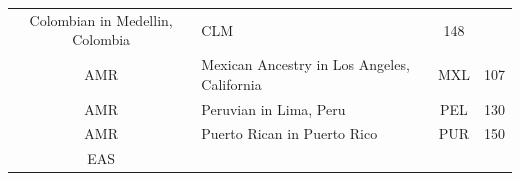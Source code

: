 \documentclass[]{book}
\begin{document}
\begin{longtable}[]{@{}clcc@{}}
\begin{minipage}[t]{0.59\columnwidth}
Colombian in Medellin, Colombia\strut
\end{minipage} & \begin{minipage}[t]{0.09\columnwidth}\centering\strut
CLM\strut
\end{minipage} & \begin{minipage}[t]{0.07\columnwidth}\centering\strut
148\strut
\end{minipage}\tabularnewline
\begin{minipage}[t]{0.14\columnwidth}\centering\strut
AMR\strut
\end{minipage} & \begin{minipage}[t]{0.59\columnwidth}\raggedright\strut
Mexican Ancestry in Los Angeles, California\strut
\end{minipage} & \begin{minipage}[t]{0.09\columnwidth}\centering\strut
MXL\strut
\end{minipage} & \begin{minipage}[t]{0.07\columnwidth}\centering\strut
107\strut
\end{minipage}\tabularnewline
\begin{minipage}[t]{0.14\columnwidth}\centering\strut
AMR\strut
\end{minipage} & \begin{minipage}[t]{0.59\columnwidth}\raggedright\strut
Peruvian in Lima, Peru\strut
\end{minipage} & \begin{minipage}[t]{0.09\columnwidth}\centering\strut
PEL\strut
\end{minipage} & \begin{minipage}[t]{0.07\columnwidth}\centering\strut
130\strut
\end{minipage}\tabularnewline
\begin{minipage}[t]{0.14\columnwidth}\centering\strut
AMR\strut
\end{minipage} & \begin{minipage}[t]{0.59\columnwidth}\raggedright\strut
Puerto Rican in Puerto Rico\strut
\end{minipage} & \begin{minipage}[t]{0.09\columnwidth}\centering\strut
PUR\strut
\end{minipage} & \begin{minipage}[t]{0.07\columnwidth}\centering\strut
150\strut
\end{minipage}\tabularnewline
\begin{minipage}[t]{0.14\columnwidth}\centering\strut
EAS\strut
\end{minipage} & \begin{minipage}[t]{0.59\columnwidth}\raggedright\strut

\end{minipage}
\end{longtable}
\end{document}
